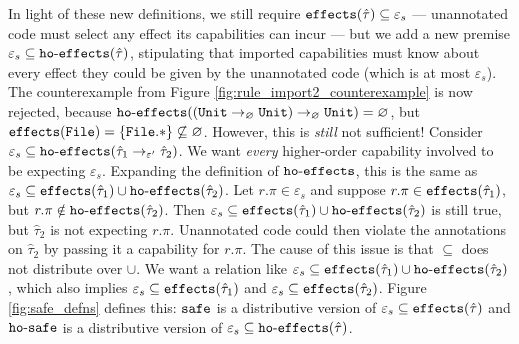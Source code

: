 In light of these new definitions, we still require
$\mathtt{effects}(\hat \tau) \subseteq \varepsilon_s$ --- unannotated code must
select any effect its capabilities can incur --- but we add a new
premise $\varepsilon_s \subseteq \mathtt{ho \hbox{-} effects}(\hat \tau)$, stipulating that
imported capabilities must know about every effect they could be given
by the unannotated code (which is at most $\varepsilon_s$). The
counterexample from Figure \ref{fig:rule_import2_counterexample} is
now rejected, because
$\mathtt{ho \hbox{-} effects}((\mathtt{Unit} \rightarrow_{\varnothing} \mathtt{Unit})
  \rightarrow_{\varnothing} \mathtt{Unit}) = \varnothing$, but
$\mathtt{effects}(\mathtt{File}) = \{ \mathtt{File.*} \} \not\subseteq \varnothing$.  However, this is
\textit{still} not sufficient! Consider
$\varepsilon_s \subseteq \mathtt{ho \hbox{-} effects}( \hat \tau_1 \rightarrow_{\varepsilon'}
  \hat \tau_2 )$. We want \textit{every} higher-order capability
involved to be expecting $\varepsilon_s$. Expanding the definition of
$\mathtt{ho \hbox{-} effects}$, this is the same as
$\varepsilon_s \subseteq \mathtt{effects}(\hat \tau_1) \cup \mathtt{ho \hbox{-} effects}(\hat
  \tau_2)$. Let $r.\pi \in \varepsilon_s$ and suppose
$r.\pi \in \mathtt{effects}(\hat \tau_1)$, but $r.\pi \notin \mathtt{ho \hbox{-} effects}(\hat
  \tau_2)$. Then
$\varepsilon_s \subseteq \mathtt{effects}(\hat \tau_1) \cup \mathtt{ho \hbox{-} effects}(\hat \tau_2)$ is
still true, but $\hat \tau_2$ is not expecting $r.\pi$. Unannotated
code could then violate the annotations on $\hat \tau_2$ by passing it
a capability for $r.\pi$. The cause of this issue is that $\subseteq$
does not distribute over $\cup$. We want a relation like
$\varepsilon_s \subseteq \mathtt{effects}(\hat \tau_1) \cup \mathtt{ho \hbox{-} effects}(\hat \tau_2)$,
which also implies $\varepsilon_s \subseteq \mathtt{effects}(\hat \tau_1)$ and
$\varepsilon_s \subseteq \mathtt{effects}(\hat \tau_2)$. Figure
\ref{fig:safe_defns} defines this: $\mathtt{safe}$ is a distributive
version of $\varepsilon_s \subseteq \mathtt{effects}(\hat \tau)$ and
$\mathtt{ho \hbox{-} safe}$ is a distributive version of
$\varepsilon_s \subseteq \mathtt{ho \hbox{-} effects}(\hat \tau)$.

